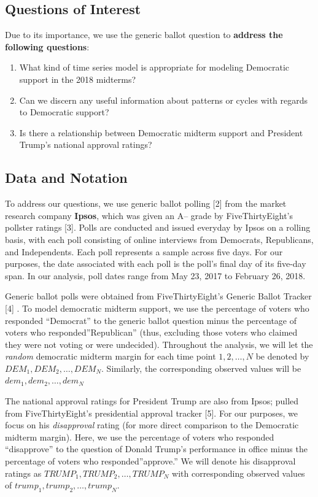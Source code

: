 \documentclass[]{article}
\providecommand{\tightlist}{%
  \setlength{\itemsep}{0pt}\setlength{\parskip}{0pt}}
\begin{document}
\subsection{Questions of Interest}\label{questions-of-interest}

Due to its importance, we use the generic ballot question to
\textbf{address the following questions}:

\begin{enumerate}
\def\labelenumi{\arabic{enumi}.}
\tightlist
\item
  What kind of time series model is appropriate for modeling Democratic
  support in the 2018 midterms?
\item
  Can we discern any useful information about patterns or cycles with
  regards to Democratic support?
\item
  Is there a relationship between Democratic midterm support and
  President Trump's national approval ratings?
\end{enumerate}

\subsection{Data and Notation}\label{data-and-notation}

To address our questions, we use generic ballot polling {[}2{]} from the
market research company \textbf{Ipsos}, which was given an A-- grade by
FiveThirtyEight's pollster ratings {[}3{]}. Polls are conducted and
issued everyday by Ipsos on a rolling basis, with each poll consisting
of online interviews from Democrats, Republicans, and Independents. Each
poll represents a sample across five days. For our purposes, the date
associated with each poll is the poll's final day of its five-day span.
In our analysis, poll dates range from May 23, 2017 to February 26,
2018.

Generic ballot polls were obtained from FiveThirtyEight's Generic Ballot
Tracker {[}4{]} . To model democratic midterm support, we use the
percentage of voters who responded ``Democrat'' to the generic ballot
question minus the percentage of voters who responded''Republican''
(thus, excluding those voters who claimed they were not voting or were
undecided). Throughout the analysis, we will let the \emph{random}
democratic midterm margin for each time point \(1,2,\dots,N\) be denoted
by \(DEM_1,DEM_2,\dots ,DEM_N\). Similarly, the corresponding observed
values will be \(dem_1,dem_2,\dots ,dem_N\)

The national approval ratings for President Trump are also from Ipsos;
pulled from FiveThirtyEight's presidential approval tracker {[}5{]}. For
our purposes, we focus on his \emph{disapproval} rating (for more direct
comparison to the Democratic midterm margin). Here, we use the
percentage of voters who responded ``disapprove'' to the question of
Donald Trump's performance in office minus the percentage of voters who
responded''approve.'' We will denote his disapproval ratings as
\(TRUMP_1,TRUMP_2,\dots ,TRUMP_N\) with corresponding observed values of
\(trump_1,trump_2,\dots ,trump_N\).
\end{document}
